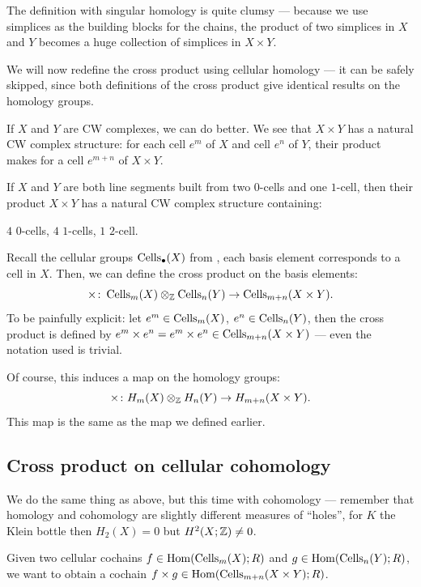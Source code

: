 The definition with singular homology is quite clumsy ---
because we use simplices as the building blocks for the chains,
the product of two simplices in $X$ and $Y$ becomes a huge collection of simplices in $X \times Y$.

We will now redefine the cross product using cellular homology ---
it can be safely skipped, since both definitions of the cross product give identical results on the
homology groups.

If $X$ and $Y$ are CW complexes, we can do better.
We see that $X \times Y$ has a natural CW complex structure: for each cell $e^m$ of $X$ and cell
$e^n$ of $Y$, their product makes for a cell $e^{m + n}$ of $X \times Y$.

\begin{example}
	If $X$ and $Y$ are both line segments built from
	two $0$-cells and one $1$-cell, then their product $X \times Y$ has a natural CW complex
	structure containing:
	\begin{itemize}
		\ii $4$ $0$-cells,
		\ii $4$ $1$-cells,
		\ii $1$ $2$-cell.
	\end{itemize}
\end{example}

Recall the cellular groups $\operatorname{Cells}_\bullet(X)$ from , each basis element
corresponds to a cell in $X$.
Then, we can define the cross product on the basis elements:
\[ \times \colon \operatorname{Cells}_m(X) \otimes_\mathbb Z \operatorname{Cells}_n(Y) \to \operatorname{Cells}_{m + n}(X \times Y). \]
To be painfully explicit:
let $e^m \in \operatorname{Cells}_m(X)$, $e^n \in \operatorname{Cells}_n(Y)$, then the cross product is defined by $e^m \times
e^n = e^m \times e^n \in \operatorname{Cells}_{m + n}(X \times Y)$ --- even the notation used is trivial.

Of course, this induces a map on the homology groups:
\[ \times \colon H_m(X) \otimes_\mathbb Z H_n(Y) \to H_{m + n}(X \times Y). \]
This map is the same as the map we defined earlier.

\subsection{Cross product on cellular cohomology}

We do the same thing as above, but this time with cohomology --- remember that homology and
cohomology are slightly different measures of ``holes'', for $K$ the Klein bottle then $H_2(X) =
0$ but $H^2(X; \mathbb Z) \neq 0$.

Given two cellular cochains $f \in \operatorname{Hom}(\operatorname{Cells}_m(X); R)$ and
$g \in \operatorname{Hom}(\operatorname{Cells}_n(Y); R)$, we want to obtain a cochain $f
\times g \in \operatorname{Hom}(\operatorname{Cells}_{m + n}(X \times Y); R)$.

